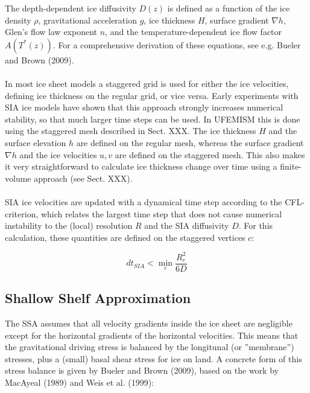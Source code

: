 \documentclass{article}
\begin{document}
The depth-dependent ice diffusivity $D(z)$ is defined as a function of the ice density $\rho$, gravitational acceleration $g$, ice thickness $H$, surface gradient $\nabla h$, Glen's flow law exponent $n$, and the temperature-dependent ice flow factor $A\left( T^{\ast}(z) \right)$. For a comprehensive derivation of these equations, see e.g. Bueler and Brown (2009).\\
\\
In most ice sheet models a staggered grid is used for either the ice velocities, defining ice thickness on the regular grid, or vice versa. Early experiments with SIA ice models have shown that this approach strongly increases numerical stability, so that much larger time steps can be used. In UFEMISM this is done using the staggered mesh described in Sect. XXX. The ice thickness $H$ and the surface elevation $h$ are defined on the regular mesh, whereas the surface gradient $\nabla h$ and the ice velocities $u,v$ are defined on the staggered mesh. This also makes it very straightforward to calculate ice thickness change over time using a finite-volume approach (see Sect. XXX).\\
\\
SIA ice velocities are updated with a dynamical time step according to the CFL-criterion, which relates the largest time step that does not cause numerical instability to the (local) resolution $R$ and the SIA diffusivity $D$. For this calculation, these quantities are defined on the staggered vertices $c$:

\begin{equation} \label{eq:SIA_dt}
dt_{SIA} < \min_c \frac{R_c^2}{6D}
\end{equation}

\subsection{Shallow Shelf Approximation}

The SSA assumes that all velocity gradients inside the ice sheet are negligible except for the horizontal gradients of the horizontal velocities. This means that the gravitational driving stress is balanced by the longitunal (or ''membrane'') stresses, plus a (small) basal shear stress for ice on land. A concrete form of this stress balance is given by Bueler and Brown (2009), based on the work by MacAyeal (1989) and Weis et al. (1999):
\end{document}
